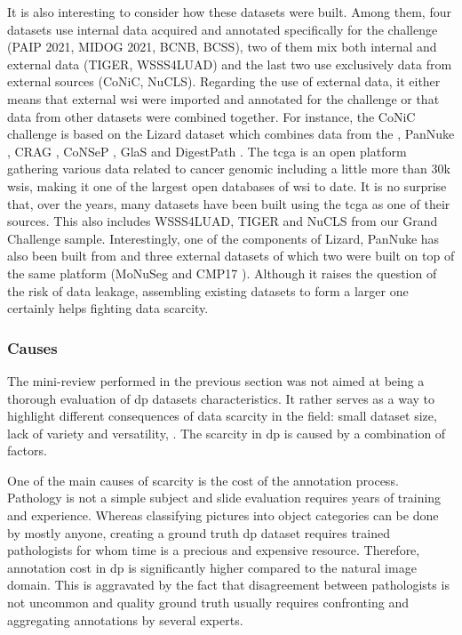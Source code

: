 It is also interesting to consider how these datasets were built. Among them, four datasets use internal data acquired and annotated specifically for the challenge (PAIP 2021, MIDOG 2021, BCNB, BCSS), two of them mix both internal and external data (TIGER, WSSS4LUAD) and the last two use exclusively data from external sources (CoNiC, NuCLS). Regarding the use of external data, it either means that external \acrshort{wsi} were imported and annotated for the challenge or that data from other datasets were combined together. For instance, the CoNiC challenge is based on the Lizard dataset \cite{graham2021lizard} which combines data from the  \cite{weinstein2013cancer}, PanNuke \cite{gamper2019pannuke}, CRAG \cite{graham2019mild}, CoNSeP \cite{graham2019hover}, GlaS \cite{sirinukunwattana2017gland} and DigestPath \cite{li2019signet}. The \acrshort{tcga} is an open platform gathering various data related to cancer genomic including a little more than 30k \acrlong{wsi}s, making it one of the largest open databases of \acrshort{wsi} to date. It is no surprise that, over the years, many datasets have been built using the \acrshort{tcga} as one of their sources. This also includes WSSS4LUAD, TIGER and NuCLS from our Grand Challenge sample. Interestingly, one of the components of Lizard, PanNuke has also been built from  and three external datasets of which two were built on top of the same platform (MoNuSeg \cite{kumar2019multi} and CMP17 \cite{vu2019methods}). Although it raises the question of the risk of data leakage, assembling existing datasets to form a larger one certainly helps fighting data scarcity.

\subsubsection{Causes}
\label{sssec:backdp:ds-causes}

The mini-review performed in the previous section was not aimed at being a thorough evaluation of \acrshort{dp} datasets characteristics. It rather serves as a way to highlight different consequences of data scarcity in the field: small dataset size, lack of variety and versatility, \etc. The scarcity in \acrlong{dp} is caused by a combination of factors.  

One of the main causes of scarcity is the cost of the annotation process. Pathology is not a simple subject and slide evaluation requires years of training and experience. Whereas classifying pictures into object categories can be done by mostly anyone, creating a ground truth \acrlong{dp} dataset requires trained pathologists for whom time is a precious and expensive resource. Therefore, annotation cost in \acrlong{dp} is significantly higher compared to the natural image domain. This is aggravated by the fact that disagreement between pathologists is not uncommon and quality ground truth usually requires confronting and aggregating annotations by several experts. 


